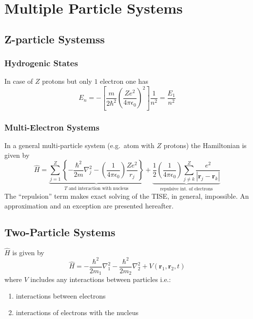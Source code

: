 \section{Multiple Particle Systems}
\subsection{Z-particle Systemss}
\subsubsection{Hydrogenic States}
In case of $Z$ protons but only $1$ electron one has
\begin{equation*}
    E_n = -\left[\frac{m}{2\hbar^2}{\left(\frac{Z e^2}{4\pi\epsilon_0}\right)}^2\right]\frac{1}{n^2} = \frac{E_1}{n^2}
\end{equation*}
\subsubsection{Multi-Electron Systems}
In a general multi-particle system (e.g.\ atom with $Z$ protons) the Hamiltonian is given by
    {\small     %
        \begin{equation*}
            \widehat{H}=\underbrace{\sum_{j=1}^{Z}\left\{-\frac{\hbar^{2}}{2m}\nabla_{j}^{2}-\left(\frac{1}{4\pi \epsilon_{0}}\right)\frac{Ze^{2}}{r_{j}}\right\}}_{T\text{ and interaction with nucleus}} + \underbrace{\frac{1}{2}\left(\frac{1}{4\pi \epsilon_{0}}\right)\sum_{j\neq k}^{Z}\frac{e^{2}}{\left|\mathbf{r}_{j}-\mathbf{r}_{k}\right|}}_{\text{repulsive int.\ of electrons}}
        \end{equation*}
    }
The ``repulsion'' term makes exact solving of the TISE, in general, impossible. An approximation and an exception are presented hereafter.

\subsection{Two-Particle Systems}
$\widehat{H}$ is given by
\begin{equation*}
    \widehat{H}=-\frac{\hbar^{2}}{2m_{1}}\nabla_{1}^{2}-\frac{\hbar^{2}}{2m_{2}}\nabla_{2}^{2}+V(\mathbf{r}_{1},\mathbf{r}_{2},t)
\end{equation*}
where $V$ includes any interactions between particles i.e.:
\begin{enumerate}
    \item interactions between  electrons
    \item interactions of electrons with the nucleus
\end{enumerate}

